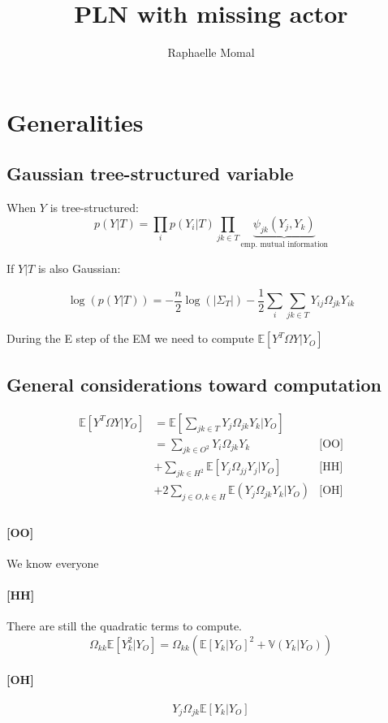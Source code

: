 \documentclass[11pt,a4paper]{article}
\author{Raphaelle Momal}
\title{PLN with missing actor}
\newcommand{\Esp}{\mathds{E}}
\begin{document}
\maketitle

\section*{Generalities}

\subsection{Gaussian tree-structured variable}
When $Y$ is tree-structured:
$$ p(Y|T) = \prod_i  p(Y_i|T) \prod_{jk\in T} \underbrace{\psi_{jk}(Y_j,Y_k)}_{\text{emp. mutual  information}}$$

If $Y|T$ is also Gaussian:

$$\log(p(Y|T)) = -\frac{n}{2}\log(|\Sigma_T|) - \frac{1}{2} \sum_i\sum_{jk\in T} Y_{ij} \Omega_{jk} Y_{ik}$$

During the E step of the EM we need to compute $\Esp[Y^T\Omega Y|Y_O]$
\subsection{General considerations toward computation}
\begin{align*}
 \Esp[Y^T\Omega Y|Y_O] &=\Esp\left[\sum_{jk\in T } Y_j\Omega_{jk}Y_k|Y_O\right]&\\
& = \sum_{jk\in O^2} Y_i\Omega_{jk} Y_k & \text{[OO]}\\
&+\sum_{jk \in H^2} \Esp[Y_j\Omega_{jj}Y_j|Y_O] & \text{[HH]} \\
&+2 \sum_{j\in O, k \in H} \Esp(Y_j\Omega_{jk} Y_k |Y_O) & \text{[OH]}\\
\end{align*}

\paragraph{[OO]} We know everyone
\paragraph{[HH]} There are still the quadratic terms to compute. 
$$ \Omega_{kk} \Esp[Y_k^2|Y_O] = \Omega_{kk} \left( \Esp [Y_k|Y_O]^2 + \mathds{V}(Y_k|Y_O)\right)$$

\paragraph{[OH]}$$ Y_j\Omega_{jk}\Esp[Y_k|Y_O]$$
\end{document}
